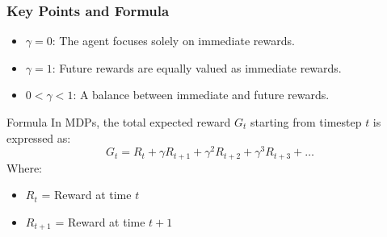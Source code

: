 \documentclass[aspectratio=169]{beamer}
\begin{document}
\begin{frame}[fragile]
    \frametitle{Key Points and Formula}
    \begin{itemize}
        \item \( \gamma = 0 \): The agent focuses solely on immediate rewards.
        \item \( \gamma = 1 \): Future rewards are equally valued as immediate rewards.
        \item \( 0 < \gamma < 1 \): A balance between immediate and future rewards.
    \end{itemize}
    
    \begin{block}{Formula}
        In MDPs, the total expected reward \( G_t \) starting from timestep \( t \) is expressed as:
        \begin{equation}
            G_t = R_t + \gamma R_{t+1} + \gamma^2 R_{t+2} + \gamma^3 R_{t+3} + \ldots
        \end{equation}
        Where:
        \begin{itemize}
            \item \( R_t \) = Reward at time \( t \)
            \item \( R_{t+1} \) = Reward at time \( t+1 \)
        \end{itemize}
    \end{block}
\end{frame}
\end{document}
